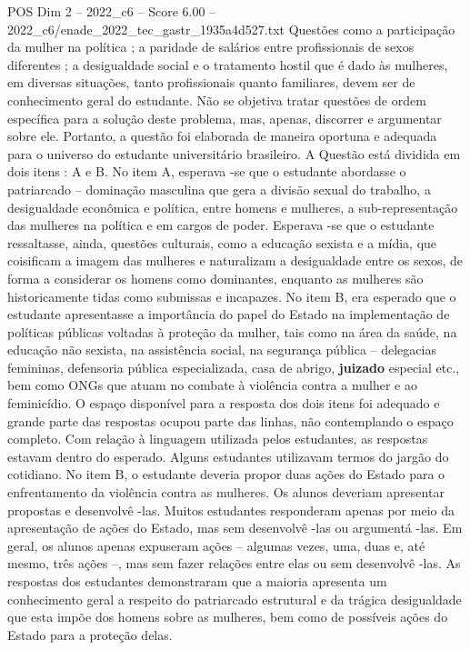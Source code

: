 \begin{textsample}{POS Dim 2 – 2022\_c6 – Score 6.00 – 2022\_c6/enade\_2022\_tec\_gastr\_1935a4d527.txt}
Questões como a participação da mulher na política ; a paridade de salários entre profissionais de sexos diferentes ; a desigualdade social e o tratamento hostil que é dado às mulheres, em diversas situações, tanto profissionais quanto familiares, devem ser de conhecimento geral do estudante.
Não se objetiva tratar questões de ordem específica para a solução deste problema, mas, apenas, discorrer e argumentar sobre ele.
Portanto, a questão foi elaborada de maneira oportuna e adequada para o universo do estudante universitário brasileiro.
A Questão está dividida em dois itens : A e B.
No item A, esperava -se que o estudante abordasse o patriarcado – dominação masculina que gera a divisão sexual do trabalho, a desigualdade econômica e política, entre homens e mulheres, a sub-representação das mulheres na política e em cargos de poder.
Esperava -se que o estudante ressaltasse, ainda, questões culturais, como a educação sexista e a mídia, que coisificam a imagem das mulheres e naturalizam a desigualdade entre os sexos, de forma a considerar os homens como dominantes, enquanto as mulheres são historicamente tidas como submissas e incapazes.
No item B, era esperado que o estudante apresentasse a importância do papel do Estado na implementação de políticas públicas voltadas à proteção da mulher, tais como na área da saúde, na educação não sexista, na assistência social, na segurança pública – delegacias femininas, defensoria pública especializada, casa de abrigo, \textbf{juizado} especial etc., bem como ONGs que atuam no combate à violência contra a mulher e ao feminicídio.
O espaço disponível para a resposta dos dois itens foi adequado e grande parte das respostas ocupou parte das linhas, não contemplando o espaço completo.
Com relação à linguagem utilizada pelos estudantes, as respostas estavam dentro do esperado.
Alguns estudantes utilizavam termos do jargão do cotidiano.
No item B, o estudante deveria propor duas ações do Estado para o enfrentamento da violência contra as mulheres.
Os alunos deveriam apresentar propostas e desenvolvê -las.
Muitos estudantes responderam apenas por meio da apresentação de ações do Estado, mas sem desenvolvê -las ou argumentá -las.
Em geral, os alunos apenas expuseram ações – algumas vezes, uma, duas e, até mesmo, três ações –, mas sem fazer relações entre elas ou sem desenvolvê -las.
As respostas dos estudantes demonstraram que a maioria apresenta um conhecimento geral a respeito do patriarcado estrutural e da trágica desigualdade que esta impõe dos homens sobre as mulheres, bem como de possíveis ações do Estado para a proteção delas.

\end{textsample}

